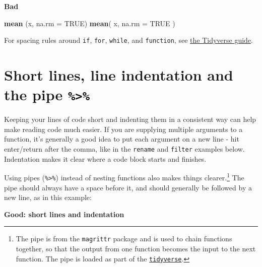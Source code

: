 \documentclass[
]{book}
\newenvironment{Shaded}{\begin{snugshade}}{\end{snugshade}}
\newcommand{\DataTypeTok}[1]{\textcolor[rgb]{0.13,0.29,0.53}{#1}}
\newcommand{\KeywordTok}[1]{\textcolor[rgb]{0.13,0.29,0.53}{\textbf{#1}}}
\newcommand{\NormalTok}[1]{#1}
\newcommand{\OtherTok}[1]{\textcolor[rgb]{0.56,0.35,0.01}{#1}}
\begin{document}
\textbf{Bad}

\begin{Shaded}
\begin{Highlighting}[]
\KeywordTok{mean}\NormalTok{ (x, }\DataTypeTok{na.rm =} \OtherTok{TRUE}\NormalTok{)}
\KeywordTok{mean}\NormalTok{( x, }\DataTypeTok{na.rm =} \OtherTok{TRUE}\NormalTok{ )}
\end{Highlighting}
\end{Shaded}

For spacing rules around \texttt{if}, \texttt{for}, \texttt{while}, and \texttt{function}, see \href{https://style.tidyverse.org/syntax.html\#parentheses}{the Tidyverse guide}.

\hypertarget{short-lines-line-indentation-and-the-pipe}{%
\section{\texorpdfstring{Short lines, line indentation and the pipe \texttt{\%\textgreater{}\%}}{Short lines, line indentation and the pipe \%\textgreater\%}}\label{short-lines-line-indentation-and-the-pipe}}

Keeping your lines of code short and indenting them in a consistent way can help make reading code much easier. If you are supplying multiple arguments to a function, it's generally a good idea to put each argument on a new line - hit enter/return after the comma, like in the \texttt{rename} and \texttt{filter} examples below. Indentation makes it clear where a code block starts and finishes.

Using pipes (\texttt{\%\textgreater{}\%}) instead of nesting functions also makes things clearer.\footnote{The pipe is from the \texttt{magrittr} package and is used to chain functions together, so that the output from one function becomes the input to the next function. The pipe is loaded as part of the \protect\hyperlink{tidyverse}{\texttt{tidyverse}}.} The pipe should always have a space before it, and should generally be followed by a new line, as in this example:

\textbf{Good: short lines and indentation}
\end{document}
